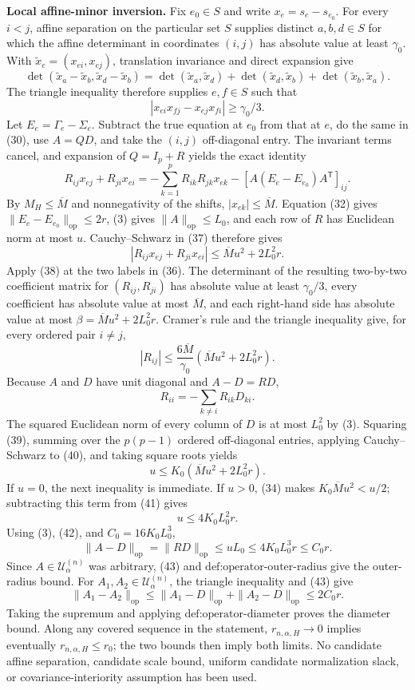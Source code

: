 \textbf{Local affine-minor inversion.}
Fix \(e_0\in S\) and write \(x_e=s_e-s_{e_0}\). For every \(i<j\), affine separation on the particular set \(S\) supplies distinct \(a,b,d\in S\) for which the affine determinant in coordinates \((i,j)\) has absolute value at least \(\gamma_0\). With \(\widetilde x_e=(x_{ei},x_{ej})\), translation invariance and direct expansion give
\[
\det(\widetilde x_a-\widetilde x_b,
\widetilde x_d-\widetilde x_b)
=\det(\widetilde x_a,\widetilde x_d)
+\det(\widetilde x_d,\widetilde x_b)
+\det(\widetilde x_b,\widetilde x_a).
\tag{35}
\]
The triangle inequality therefore supplies \(e,f\in S\) such that
\[
|x_{ei}x_{fj}-x_{ej}x_{fi}|\geq\gamma_0/3.
\tag{36}
\]
Let \(E_e=\Gamma_e-\Sigma_e\). Subtract the true equation at \(e_0\) from that at \(e\), do the same in (30), use \(A=QD\), and take the \((i,j)\) off-diagonal entry. The invariant terms cancel, and expansion of \(Q=I_p+R\) yields the exact identity
\[
R_{ij}x_{ej}+R_{ji}x_{ei}
=-\sum_{k=1}^pR_{ik}R_{jk}x_{ek}
-[A(E_e-E_{e_0})A^{\mathsf T}]_{ij}.
\tag{37}
\]
By \(M_H\leq\overline M\) and nonnegativity of the shifts, \(|x_{ek}|\leq\overline M\). Equation (32) gives \(\|E_e-E_{e_0}\|_{\mathrm{op}}\leq2r\), (3) gives \(\|A\|_{\mathrm{op}}\leq L_0\), and each row of \(R\) has Euclidean norm at most \(u\). Cauchy--Schwarz in (37) therefore gives
\[
|R_{ij}x_{ej}+R_{ji}x_{ei}|
\leq\overline M u^2+2L_0^2r.
\tag{38}
\]
Apply (38) at the two labels in (36). The determinant of the resulting two-by-two coefficient matrix for \((R_{ij},R_{ji})\) has absolute value at least \(\gamma_0/3\), every coefficient has absolute value at most \(\overline M\), and each right-hand side has absolute value at most \(\beta=\overline M u^2+2L_0^2r\). Cramer's rule and the triangle inequality give, for every ordered pair \(i\ne j\),
\[
|R_{ij}|
\leq\frac{6\overline M}{\gamma_0}
\left(\overline M u^2+2L_0^2r\right).
\tag{39}
\]
Because \(A\) and \(D\) have unit diagonal and \(A-D=RD\),
\[
R_{ii}=-\sum_{k\ne i}R_{ik}D_{ki}.
\tag{40}
\]
The squared Euclidean norm of every column of \(D\) is at most \(L_0^2\) by (3). Squaring (39), summing over the \(p(p-1)\) ordered off-diagonal entries, applying Cauchy--Schwarz to (40), and taking square roots yields
\[
u\leq K_0\left(\overline M u^2+2L_0^2r\right).
\tag{41}
\]
If \(u=0\), the next inequality is immediate. If \(u>0\), (34) makes \(K_0\overline M u^2<u/2\); subtracting this term from (41) gives
\[
u\leq4K_0L_0^2r.
\tag{42}
\]
Using (3), (42), and \(C_0=16K_0L_0^3\),
\[
\|A-D\|_{\mathrm{op}}
=\|RD\|_{\mathrm{op}}
\leq uL_0
\leq4K_0L_0^3r
\leq C_0r.
\tag{43}
\]
Since \(A\in\mathcal U^{(n)}_\alpha\) was arbitrary, (43) and \(\text{def:operator-outer-radius}\) give the outer-radius bound. For \(A_1,A_2\in\mathcal U^{(n)}_\alpha\), the triangle inequality and (43) give
\[
\|A_1-A_2\|_{\mathrm{op}}
\leq\|A_1-D\|_{\mathrm{op}}+\|A_2-D\|_{\mathrm{op}}
\leq2C_0r.
\]
Taking the supremum and applying \(\text{def:operator-diameter}\) proves the diameter bound. Along any covered sequence in the statement, \(r_{n,\alpha,H}\to0\) implies eventually \(r_{n,\alpha,H}\leq r_0\); the two bounds then imply both limits. No candidate affine separation, candidate scale bound, uniform candidate normalization slack, or covariance-interiority assumption has been used.